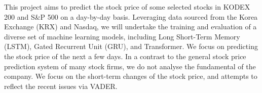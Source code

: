 This project aims to predict the stock price of some selected stocks in KODEX 200 and S\&P 500 on a day-by-day basis.
Leveraging data sourced from the Korea Exchange (KRX) and Nasdaq, we will undertake the training and evaluation of a diverse set of machine learning models, including Long Short-Term Memory (LSTM), Gated Recurrent Unit (GRU), and Transformer. 
We focus on predicting the stock price of the next a few days. 
In a contrast to the general stock price prediction system of many stock firms, we do not analyse the fundamental of the company. 
We focus on the short-term changes of the stock price, and attempts to reflect the recent issues via VADER.



